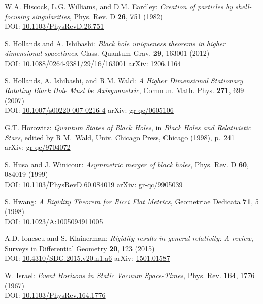 \begin{thebibliography}{123}
W.A. Hiscock, L.G. Williams, and D.M. Eardley:
{\em Creation of particles by shell-focusing singularities},
Phys. Rev. D {\bf 26}, 751 (1982)\\
DOI: \href{https://doi.org/10.1103/PhysRevD.26.751}{10.1103/PhysRevD.26.751}

S. Hollands and A. Ishibashi:
{\em Black hole uniqueness theorems in higher dimensional spacetimes},
Class. Quantum Grav. {\bf 29}, 163001 (2012)\\
DOI: \href{https://doi.org/10.1088/0264-9381/29/16/163001}{10.1088/0264-9381/29/16/163001}\hfill
arXiv: \href{https://arxiv.org/abs/1206.1164}{1206.1164}

S. Hollands, A. Ishibashi, and R.M. Wald:
{\em A Higher Dimensional Stationary Rotating Black Hole Must be Axisymmetric},
Commun. Math. Phys. {\bf 271}, 699 (2007)\\
DOI: \href{https://doi.org/10.1007/s00220-007-0216-4}{10.1007/s00220-007-0216-4}\hfill
arXiv: \href{https://arxiv.org/abs/gr-qc/0605106}{gr-qc/0605106}

G.T. Horowitz:
{\em Quantum States of Black Holes},
in {\em Black Holes and Relativistic Stars}, edited by R.M.~Wald,
Univ. Chicago Press, Chicago (1998), p.~241\\
arXiv: \href{https://arxiv.org/abs/gr-qc/9704072}{gr-qc/9704072}

S. Husa and J. Winicour:
{\em Asymmetric merger of black holes},
Phys. Rev. D {\bf 60}, 084019 (1999)\\
DOI: \href{https://doi.org/10.1103/PhysRevD.60.084019}{10.1103/PhysRevD.60.084019}\hfill
arXiv: \href{https://arxiv.org/abs/gr-qc/9905039}{gr-qc/9905039}

S. Hwang:
{\em A Rigidity Theorem for Ricci Flat Metrics},
Geometriae Dedicata {\bf 71}, 5 (1998)\\
DOI: \href{https://doi.org/10.1023/A:1005094911005}{10.1023/A:1005094911005}

A.D. Ionescu and S. Klainerman:
{\em Rigidity results in general relativity: A review},
Surveys in Differential Geometry {\bf 20}, 123 (2015)\\
DOI: \href{https://dx.doi.org/10.4310/SDG.2015.v20.n1.a6}{10.4310/SDG.2015.v20.n1.a6}\hfill
arXiv: \href{https://arxiv.org/abs/1501.01587}{1501.01587}

W. Israel: {\em Event Horizons in Static Vacuum Space-Times},
Phys. Rev. {\bf 164}, 1776 (1967)\\
DOI: \href{https://doi.org/10.1103/PhysRev.164.1776}{10.1103/PhysRev.164.1776}


\end{thebibliography}
